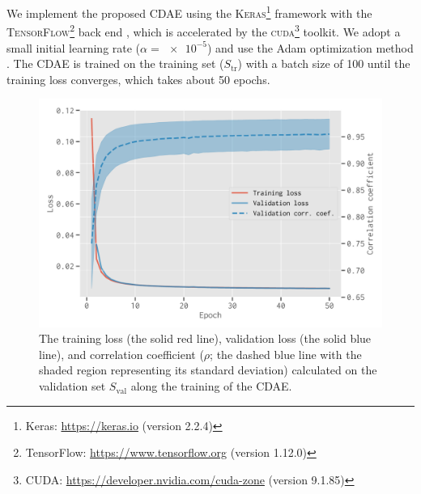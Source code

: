 \documentclass[fleqn,usenatbib]{mnras}
\newcommand{\R}[1]{\mathrm{#1}}
\begin{document}
We implement the proposed CDAE using the
\textsc{Keras}\footnote{Keras: \url{https://keras.io} (version 2.2.4)}
framework \citep{keras} with the
\textsc{TensorFlow}\footnote{TensorFlow:
  \url{https://www.tensorflow.org} (version 1.12.0)}
back end \citep{tensorflow},
which is accelerated by the \textsc{cuda}\footnote{\raggedright%
  CUDA: \url{https://developer.nvidia.com/cuda-zone} (version 9.1.85)}
toolkit.
We adopt a small initial learning rate ($\alpha = \num{e-5}$) and use the
Adam optimization method \citep{kingma2015}.
The CDAE is trained on the training set ($S_{\R{tr}}$) with a batch size of
100 until the training loss converges, which takes about 50 epochs.

\begin{figure}
  \centering
  \includegraphics[width=\columnwidth]{cdae-train}
  \caption{\label{fig:train}%
    The training loss (the solid red line), validation loss (the solid blue
    line), and correlation coefficient ($\rho$; the dashed blue
    line with the shaded region representing its standard deviation)
    calculated on the validation set $S_{\R{val}}$ along the training of
    the CDAE.
  }
\end{figure}
\end{document}
